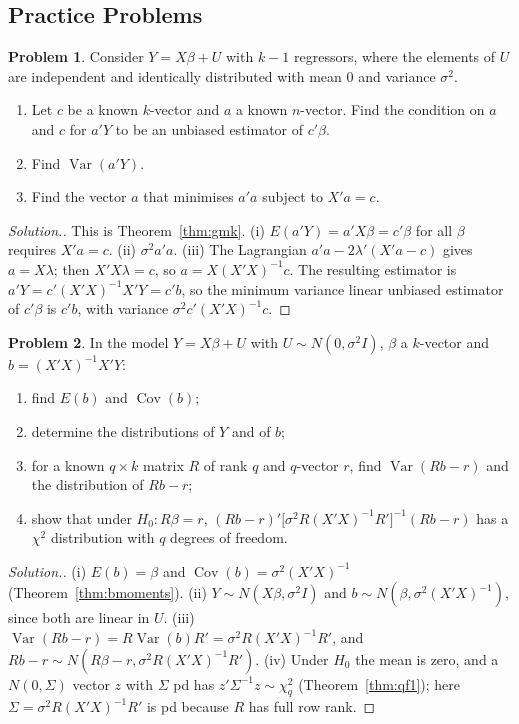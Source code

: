\documentclass[11pt,a4paper]{article}
\numberwithin{equation}{section}
\DeclareMathOperator{\Var}{Var}
\DeclareMathOperator{\Cov}{Cov}
\theoremstyle{definition}
\newtheorem{problemx}{Problem}[subsection]
\newenvironment{problem}{\begin{problemx}}{\end{problemx}}
\newenvironment{solution}
  {\renewcommand{\qedsymbol}{}\begin{proof}[\textit{Solution}.]}
  {\end{proof}}
\begin{document}
\subsection{Practice Problems}

\begin{problem}
Consider $Y = X\beta + U$ with $k - 1$ regressors, where the elements of $U$ are independent and identically distributed with mean $0$ and variance
$\sigma^2$.
\begin{enumerate}[label=(\roman*)]
\item Let $c$ be a known $k$-vector and $a$ a known $n$-vector. Find the condition on $a$ and $c$ for $a'Y$ to be an unbiased estimator of $c'\beta$.
\item Find $\Var(a'Y)$.
\item Find the vector $a$ that minimises $a'a$ subject to $X'a = c$.
\end{enumerate}
\end{problem}

\begin{solution}
This is Theorem~\ref{thm:gmk}. (i) $E(a'Y) = a'X\beta = c'\beta$ for all $\beta$ requires $X'a = c$. (ii) $\sigma^2a'a$. (iii) The Lagrangian
$a'a - 2\lambda'(X'a - c)$ gives $a = X\lambda$; then $X'X\lambda = c$, so $a = X(X'X)^{-1}c$. The resulting estimator is $a'Y = c'(X'X)^{-1}X'Y = c'b$, so the minimum
variance linear unbiased estimator of $c'\beta$ is $c'b$, with variance $\sigma^2c'(X'X)^{-1}c$.
\end{solution}

\begin{problem}
In the model $Y = X\beta + U$ with $U \sim N(0, \sigma^2I)$, $\beta$ a $k$-vector and $b = (X'X)^{-1}X'Y$:
\begin{enumerate}[label=(\roman*)]
\item find $E(b)$ and $\Cov(b)$;
\item determine the distributions of $Y$ and of $b$;
\item for a known $q \times k$ matrix $R$ of rank $q$ and $q$-vector $r$, find $\Var(Rb - r)$ and the distribution of $Rb - r$;
\item show that under $H_0\colon R\beta = r$, $(Rb - r)'\bigl[\sigma^2R(X'X)^{-1}R'\bigr]^{-1}(Rb - r)$ has a $\chi^2$ distribution with $q$ degrees of freedom.
\end{enumerate}
\end{problem}

\begin{solution}
(i) $E(b) = \beta$ and $\Cov(b) = \sigma^2(X'X)^{-1}$ (Theorem~\ref{thm:bmoments}). (ii) $Y \sim N(X\beta, \sigma^2I)$ and $b \sim N(\beta, \sigma^2(X'X)^{-1})$, since both
are linear in $U$. (iii) $\Var(Rb - r) = R\Var(b)R' = \sigma^2R(X'X)^{-1}R'$, and $Rb - r \sim N(R\beta - r, \sigma^2R(X'X)^{-1}R')$. (iv) Under $H_0$ the mean is zero,
and a $N(0, \Sigma)$ vector $z$ with $\Sigma$ pd has $z'\Sigma^{-1}z \sim \chi^2_q$ (Theorem~\ref{thm:qf1}); here $\Sigma = \sigma^2R(X'X)^{-1}R'$ is pd because $R$ has
full row rank.
\end{solution}
\end{document}
